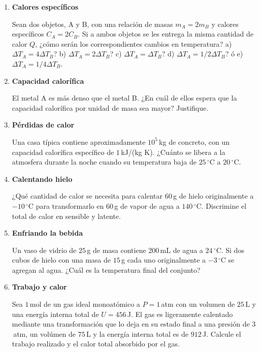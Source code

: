 \documentclass[a4paper,12pt]{article}
\begin{document}
\begin{enumerate}
	\item {\bf{Calores específicos}}
 
		Sean dos objetos, A y B, con una relación de masas $m_A = 2 m_B$ y
		calores específicos $C_A = 2 C_B$. Si a ambos objetos se les entrega la
		misma cantidad de calor $Q$, ¿cómo serán los correspondientes cambios
		en temperatura? a) $\Delta T_A = 4 \Delta T_B$? b) $\Delta T_A = 2
		\Delta T_B$? c) $\Delta T_A = \Delta T_B$? d) $\Delta T_A = 1/2 \Delta
		T_B$? ó e) $\Delta T_A = 1/4 \Delta T_B$.

	\item {\bf{Capacidad calorífica}}

		El metal A es más denso que el metal B. ¿En cuál de ellos espera que la
		capacidad calorífica por unidad de masa sea mayor? Justifique.

	\item {\bf{Pérdidas de calor}} 

		Una casa típica contiene aproximadamente $10^5$\,kg de concreto, con un
		capacidad calorífica específico de $1$\,kJ/(kg K). ¿Cuánto se libera a
		la atmosfera durante la noche cuando su temperatura baja de
		$25\,^\circ$C a $20\,^\circ$C.

	\item {\bf{Calentando hielo}}

		¿Qué cantidad de calor se necesita para calentar $60$\,g de hielo
		originalmente a $-10\,^\circ$C para transformarlo en $60$\,g de vapor
		de agua a $140\,^\circ$C. Discrimine el total de calor en sensible y
		latente.

	\item {\bf{Enfriando la bebida}}

		Un vaso de vidrio de $25$\,g de masa contiene 200\,mL de agua a
		$24\,^\circ$C. Si dos cubos de hielo con una masa de $15$\,g cada uno
		originalmente a $-3\,^\circ$C se agregan al agua. ¿Cuál es la
		temperatura final del conjunto?

	\item {\bf{Trabajo y calor}}

		Sea $1$\,mol de un gas ideal monoatómico a $P=1$\,atm con un volumen de $25$\,L y una energía interna total de $U=456$\,J. El gas es ligeramente calentado mediante una transformación que lo deja en su estado final a una presión de $3$\,atm, un volúmen de $75$\,L y la energía interna total es de $912$\,J. Calcule el trabajo realizado y el calor total absorbido por el gas.

\end{enumerate}
\end{document}
